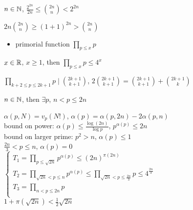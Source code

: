 \begin{lemma}
    $n \in \mathbb{N}$, $\frac{2^{2n}}{2n} \leq {2n \choose n} < 2^{2n}$
\end{lemma}
\begin{pf}
    $2n{2n \choose n} \geq (1 + 1)^{2n} > {2n \choose n}$
\end{pf}

\begin{itemize}
    \item primorial function $\prod_{p\leq x} p$
\end{itemize}

\begin{lemma}
    $x \in \mathbb{R}$, $x \geq 1$, then $\prod_{p \leq x} p \leq 4^x$
\end{lemma}
\begin{pf}
    $\prod_{k+2\leq p \leq 2k+1} p \mid {2k + 1 \choose k + 1}$, $2{2k + 1 \choose k + 1} = {2k + 1 \choose k + 1} + {2k + 1 \choose k }$
\end{pf}

\begin{thm}
    $n \in \mathbb{N}$, then $\exists p$, $n < p \leq 2n$
\end{thm}
\begin{pf}
    $\alpha(p, N) = v_p(N!)$, $\alpha(p) = \alpha(p, 2n) - 2\alpha(p, n)$\\
    bound on power: $\alpha(p) \leq \frac{\log(2n)}{\log p}$, $p^{\alpha(p)} \leq 2n$\\
    bound on larger prime: $p^2 > n$, $\alpha(p) \leq 1$\\
    $\frac{2n}{3} < p \leq n$, $\alpha(p) = 0$\\
    $\begin{cases}
        T_1 = \prod_{p \leq \sqrt{2n}} p^{\alpha(p)} \leq (2n)^{\pi(2n)}\\
        T_2 = \prod_{\sqrt{2n} < p \leq n} p^{\alpha(p)} \leq \prod_{\sqrt{2n} < p \leq \frac{2n}{3}} p \leq 4^{\frac{2n}{3}}\\
        T_3 = \prod_{n < p \leq 2n} p\\
    \end{cases}$\\
    $1 + \pi\left(\sqrt{2n}\right) < \frac{1}{2}\sqrt{2n}$
\end{pf}

